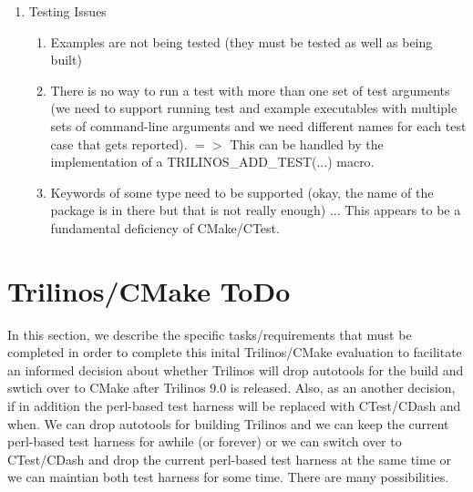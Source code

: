 \documentclass[pdf,ps2pdf,11pt]{SANDreport}
\begin{document}
\begin{enumerate}
{}\item Testing Issues

  \begin{enumerate}

  {}\item Examples are not being tested (they must be tested as well
  as being built)

  {}\item There is no way to run a test with more than one set of test
  arguments (we need to support running test and example executables
  with multiple sets of command-line arguments and we need different
  names for each test case that gets reported).  $=>$ This can be
  handled by the implementation of a TRILINOS\_ADD\_TEST(...) macro.

  {}\item Keywords of some type need to be supported (okay, the name
  of the package is in there but that is not really enough) ... This
  appears to be a fundamental deficiency of CMake/CTest.

  \end{enumerate}

\end{enumerate}


%
\section{Trilinos/CMake ToDo}
%

In this section, we describe the specific tasks/requirements that must
be completed in order to complete this inital Trilinos/CMake
evaluation to facilitate an informed decision about whether Trilinos
will drop autotools for the build and swtich over to CMake after
Trilinos 9.0 is released.  Also, as an another decision, if in
addition the perl-based test harness will be replaced with CTest/CDash
and when.  We can drop autotools for building Trilinos and we can keep
the current perl-based test harness for awhile (or forever) or we can
switch over to CTest/CDash and drop the current perl-based test
harness at the same time or we can maintian both test harness for some
time.  There are many possibilities.
\end{document}
